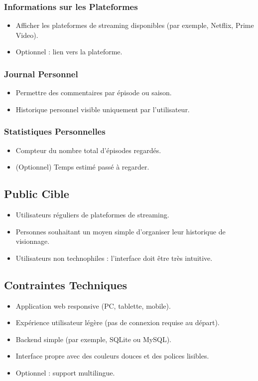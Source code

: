 \subsubsection{Informations sur les Plateformes}
\begin{itemize}
    \item Afficher les plateformes de streaming disponibles (par exemple, Netflix, Prime Video).
    \item Optionnel : lien vers la plateforme.
\end{itemize}

\subsubsection{Journal Personnel}
\begin{itemize}
    \item Permettre des commentaires par épisode ou saison.
    \item Historique personnel visible uniquement par l'utilisateur.
\end{itemize}

\subsubsection{Statistiques Personnelles}
\begin{itemize}
    \item Compteur du nombre total d'épisodes regardés.
    \item (Optionnel) Temps estimé passé à regarder.
\end{itemize}

\subsection{Public Cible}
\begin{itemize}
    \item Utilisateurs réguliers de plateformes de streaming.
    \item Personnes souhaitant un moyen simple d'organiser leur historique de visionnage.
    \item Utilisateurs non technophiles : l'interface doit être très intuitive.
\end{itemize}

\subsection{Contraintes Techniques}
\begin{itemize}
    \item Application web responsive (PC, tablette, mobile).
    \item Expérience utilisateur légère (pas de connexion requise au départ).
    \item Backend simple (par exemple, SQLite ou MySQL).
    \item Interface propre avec des couleurs douces et des polices lisibles.
    \item Optionnel : support multilingue.
\end{itemize}

